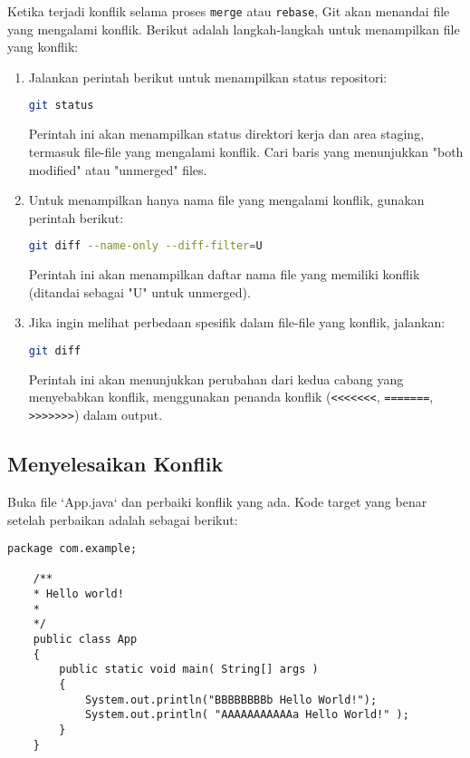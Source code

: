 Ketika terjadi konflik selama proses \texttt{merge} atau \texttt{rebase}, Git akan menandai file yang mengalami konflik. Berikut adalah langkah-langkah untuk menampilkan file yang konflik:

\begin{enumerate}
	\item Jalankan perintah berikut untuk menampilkan status repositori:
	\begin{lstlisting}[language=bash]
		git status
	\end{lstlisting}
	Perintah ini akan menampilkan status direktori kerja dan area staging, termasuk file-file yang mengalami konflik. Cari baris yang menunjukkan "both modified" atau "unmerged" files.
	
	\item Untuk menampilkan hanya nama file yang mengalami konflik, gunakan perintah berikut:
	\begin{lstlisting}[language=bash]
		git diff --name-only --diff-filter=U
	\end{lstlisting}
	Perintah ini akan menampilkan daftar nama file yang memiliki konflik (ditandai sebagai "U" untuk unmerged).
	
	\item Jika ingin melihat perbedaan spesifik dalam file-file yang konflik, jalankan:
	\begin{lstlisting}[language=bash]
		git diff
	\end{lstlisting}
	Perintah ini akan menunjukkan perubahan dari kedua cabang yang menyebabkan konflik, menggunakan penanda konflik (\texttt{<<<<<<<}, \texttt{=======}, \texttt{>>>>>>>}) dalam output.
\end{enumerate}

\subsection{Menyelesaikan Konflik}

Buka file `App.java` dan perbaiki konflik yang ada. Kode target yang benar setelah perbaikan adalah sebagai berikut:

\begin{lstlisting}[style=java]
	package com.example;
	
	/**
	* Hello world!
	*
	*/
	public class App 
	{
		public static void main( String[] args )
		{
			System.out.println("BBBBBBBBb Hello World!");
			System.out.println( "AAAAAAAAAAAa Hello World!" );
		}
	}
\end{lstlisting}

